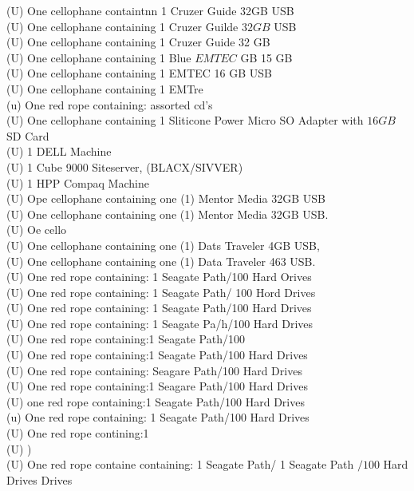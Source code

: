 \documentclass[10pt]{article}
\begin{document}
(U) One cellophane containtnn 1 Cruzer Guide 32GB USB\\
(U) One cellophane containing 1 Cruzer Guilde \(32 G B\) USB\\
(U) One cellophane containing 1 Cruzer Guide 32 GB\\
(U) One cellophane containing 1 Blue \(E M T E C\) GB 15 GB\\
(U) One cellophane containing 1 EMTEC 16 GB USB\\
(U) One cellophane containing 1 EMTre\\
(u) One red rope containing: assorted cd's\\
(U) One cellophane containing 1 Sliticone Power Micro SO Adapter with \(16 G B\) SD Card\\
(U) 1 DELL Machine\\
(U) 1 Cube 9000 Siteserver, (BLACX/SIVVER)\\
(U) 1 HPP Compaq Machine\\
(U) Ope cellophane containing one (1) Mentor Media 32GB USB\\
(U) One cellophane containing one (1) Mentor Media 32GB USB.\\
(U) Oe cello\\
(U) One cellophane containing one (1) Dats Traveler 4GB USB,\\
(U) One cellophane containing one (1) Data Traveler 463 USB.\\
(U) One red rope containing: 1 Seagate Path/100 Hard Orives\\
(U) One red rope containing: 1 Seagate Path/ 100 Hord Drives\\
(U) One red rope containing: 1 Seagate Path/100 Hard Drives\\
(U) One red rope containing: 1 Seagate Pa/h/100 Hard Drives\\
(U) One red rope containing:1 Seagate Path/100\\
(U) One red rope containing:1 Seagate Path/100 Hard Drives\\
(U) One red rope containing: Seagare Path/100 Hard Drives\\
(U) One red rope containing:1 Seagare Path/100 Hard Drives\\
(U) one red rope containing:1 Seagate Path/100 Hard Drives\\
(u) One red rope containing: 1 Seagate Path/100 Hard Drives\\
(U) One red rope contining:1\\
(U) )\\
(U) One red rope containe containing: 1 Seagate Path/ 1 Seagate Path \(/ 100\) Hard Drives Drives\\
\end{document}
